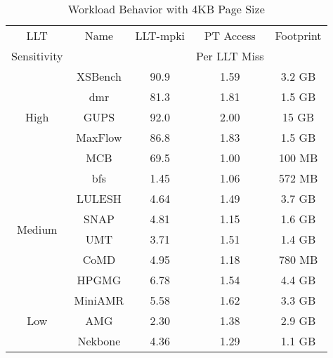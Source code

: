 \begin {table}[b]
\small
\begin{center} 
\vspace{-0.0 in}
\caption{Workload Behavior with 4KB Page Size}
\vspace{-0. in}
\begin{tabular}{| c | c | c | c | c | }
\hline
  LLT                   & Name     &  LLT-mpki  & PT Access    &  Footprint  \\ 
  Sensitivity           &          &    & Per LLT Miss   &             \\ \hline
\multirow{5}{*}{High}   & XSBench  & 90.9       & 1.59         &  3.2 GB  \\
                        & dmr      & 81.3       & 1.81         &  1.5 GB  \\
                        & GUPS     & 92.0       & 2.00         &  15  GB  \\
                        & MaxFlow  & 86.8       & 1.83         &  1.5 GB  \\
                        & MCB      & 69.5       & 1.00         &  100 MB  \\ \hline
\multirow{6}{*}{Medium} & bfs      & 1.45       & 1.06         &  572 MB  \\
                        & LULESH   & 4.64       & 1.49         &  3.7  GB \\
                        & SNAP     & 4.81       & 1.15         &  1.6 GB  \\
                        & UMT      & 3.71       & 1.51         &  1.4 GB  \\
                        & CoMD     & 4.95       & 1.18         &  780 MB  \\
                        & HPGMG    & 6.78       & 1.54         &  4.4 GB  \\ \hline 
\multirow{3}{*}{Low}    & MiniAMR  & 5.58       & 1.62         &  3.3 GB  \\
                        & AMG      & 2.30       & 1.38         &  2.9 GB  \\ 
                        & Nekbone  & 4.36       & 1.29         &  1.1 GB  \\ \hline


\end{tabular}
\label{table:bench_char}
\vspace{-0.2in}
\end{center}
\normalsize
\end{table}
